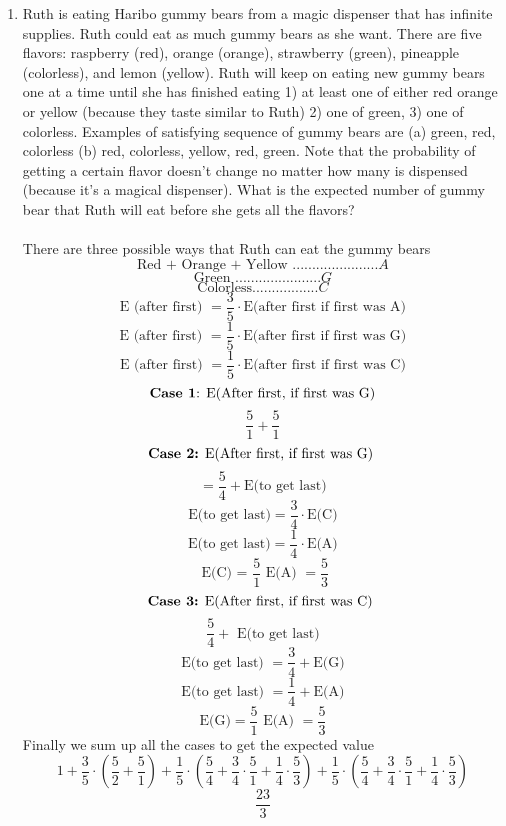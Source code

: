 \documentclass[12pt]{article}
\begin{document}
\begin{enumerate}
\item Ruth is eating Haribo gummy bears from a magic dispenser that has infinite supplies. Ruth could eat as much gummy bears as she want. There are five flavors: raspberry (red), orange (orange), strawberry (green), pineapple (colorless), and lemon (yellow). Ruth will keep on eating new gummy bears one at a time until she has finished eating 1) at least one of either red orange or yellow (because they taste similar to Ruth) 2) one of green, 3) one of colorless. Examples of satisfying sequence of gummy bears are (a) green, red, colorless (b) red, colorless, yellow, red, green. Note that the probability of getting a certain flavor doesn't change no matter how many is dispensed (because it's a magical dispenser). What is the expected number of gummy bear that Ruth will eat before she gets all the flavors? \\\\
  There are three possible ways that Ruth can eat the gummy bears \\
  \[ \text{Red + Orange + Yellow } ...................... A \]
  \[ \text{Green }...................... G \]
  \[ \text{Colorless} ................. C \]
  \[ \text{E (after first) } = \frac{3}{5} \cdot \text{E(after first if first was A)} \]
  \[ \text{E (after first) } = \frac{1}{5} \cdot \text{E(after first if first was G)} \]
  \[ \text{E (after first) } = \frac{1}{5} \cdot \text{E(after first if first was C)} \]
  \[ \text{\textbf{Case 1}: E(After first, if first was G)} \]
  \[ \dfrac{5}{1} + \dfrac{5}{1} \]
  \[ \text{\textbf{Case 2:} E(After first, if first was G) } \]
  \[ = \dfrac{5}{4} + \text{E(to get last)} \]
  \[ \text{E(to get last)} = \dfrac{3}{4} \cdot \text{E(C)} \]
  \[ \text{E(to get last)} = \dfrac{1}{4} \cdot \text{E(A)} \]
  \[ \text{ E(C) = } \dfrac{5}{1}   \text{      E(A)  } = \dfrac{5}{3} \]
  \[ \text{\textbf{Case 3:} E(After first, if first was C) } \]
  \[ \dfrac{5}{4} + \text{ E(to get last)} \]
  \[ \text{E(to get last) } = \dfrac{3}{4} + \text{E(G)} \]
  \[ \text{E(to get last) } = \dfrac{1}{4} + \text{E(A)} \]
  \[ \text{E(G)} = \dfrac{5}{1}  \text{    E(A) } = \dfrac{5}{3} \]
  Finally we sum up all the cases to get the expected value
  \[ 1 + \dfrac{3}{5} \cdot (\dfrac{5}{2} + \dfrac{5}{1}) + \dfrac{1}{5} \cdot (\dfrac{5}{4} + \dfrac{3}{4} \cdot \dfrac{5}{1} + \dfrac{1}{4} \cdot \dfrac{5}{3} ) + \dfrac{1}{5} \cdot (\dfrac{5}{4} + \dfrac{3}{4} \cdot \dfrac{5}{1} + \dfrac{1}{4} \cdot \dfrac{5}{3} ) \]
  \[\dfrac{23}{3} \]
  


\end{enumerate}
\end{document}
